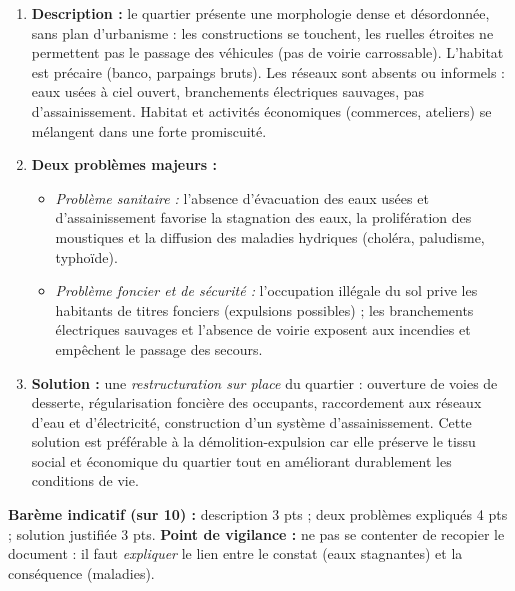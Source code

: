 \documentclass[11pt]{article}
\newcounter{popsec}
\newcounter{popsub}
\newcommand{\courssub}[1]{%
  \stepcounter{popsub}%
  \par\vspace{9pt}\noindent{\popxbold\fontsize{11.5}{13}\selectfont\color{popink}{\color{poporange}\thepopsec.\thepopsub}\hspace{6pt}#1}\par\nopagebreak\vspace{4pt}
}
\begin{document}
\courssub{Les problèmes urbains}

\begin{corrige}
\begin{enumerate}
\item \textbf{Description :} le quartier présente une morphologie dense et désordonnée, sans plan d'urbanisme : les constructions se touchent, les ruelles étroites ne permettent pas le passage des véhicules (pas de voirie carrossable). L'habitat est précaire (banco, parpaings bruts). Les réseaux sont absents ou informels : eaux usées à ciel ouvert, branchements électriques sauvages, pas d'assainissement. Habitat et activités économiques (commerces, ateliers) se mélangent dans une forte promiscuité.
\item \textbf{Deux problèmes majeurs :}
\begin{itemize}
\item \emph{Problème sanitaire :} l'absence d'évacuation des eaux usées et d'assainissement favorise la stagnation des eaux, la prolifération des moustiques et la diffusion des maladies hydriques (choléra, paludisme, typhoïde).
\item \emph{Problème foncier et de sécurité :} l'occupation illégale du sol prive les habitants de titres fonciers (expulsions possibles) ; les branchements électriques sauvages et l'absence de voirie exposent aux incendies et empêchent le passage des secours.
\end{itemize}
\item \textbf{Solution :} une \emph{restructuration sur place} du quartier : ouverture de voies de desserte, régularisation foncière des occupants, raccordement aux réseaux d'eau et d'électricité, construction d'un système d'assainissement. Cette solution est préférable à la démolition-expulsion car elle préserve le tissu social et économique du quartier tout en améliorant durablement les conditions de vie.
\end{enumerate}
\textbf{Barème indicatif (sur 10) :} description 3 pts ; deux problèmes expliqués 4 pts ; solution justifiée 3 pts. \textbf{Point de vigilance :} ne pas se contenter de recopier le document : il faut \emph{expliquer} le lien entre le constat (eaux stagnantes) et la conséquence (maladies).
\end{corrige}
\end{document}
